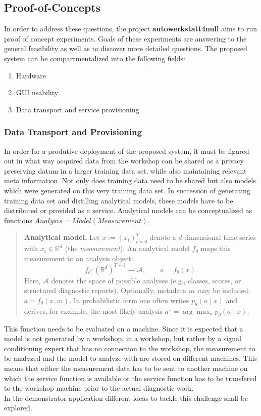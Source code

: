 \subsection{Proof-of-Concepts}
In order to address these questions, the project \textbf{autowerkstatt4null} aims to run proof of concept experiments.
Goals of these experiments are answering to the general feasibility as well as to discover more detailed questions.
The proposed system can be compartmentalized into the following fields:
\begin{enumerate}
  \item Hardware
  \item GUI usability
  \item Data transport and service provisioning 
\end{enumerate}

\subsubsection{Data Transport and Provisioning}
In order for a produtive deployment of the proposed system, it must be figured out in what way acquired data from the workshop can be shared as a privacy preserving datum in a larger training data set, while also maintaining relevant meta information.
Not only does training data need to be shared but also models which were generated on this very training data set.
In succession of generating training data set and distilling analytical models, these models have to be distributed or provided as a service.
Analytical models can be conceptualized as functions $Analysis = Model(Measurement)$.
\begin{quote}
\textbf{Analytical model.}  
Let $x := (x_t)_{t=0}^{T}$ denote a $d$-dimensional time series with $x_t \in \mathbb{R}^d$ (the \emph{measurement}).  
An analytical model $f_\theta$ maps this measurement to an analysis object:
\[
f_\theta : (\mathbb{R}^d)^{T+1} \to \mathcal{A}, \qquad a = f_\theta(x).
\]
Here, $\mathcal{A}$ denotes the space of possible analyses (e.g., classes, scores, or structured diagnostic reports).  
Optionally, metadata $m$ may be included: $a = f_\theta(x, m)$.  
In probabilistic form one often writes $p_\theta(a \mid x)$ and derives, for example, the most likely analysis 
$a^\star = \arg\max_a p_\theta(a \mid x)$.
\end{quote}
This function needs to be evaluated on a machine.
Since it is expected that a model is not generated by a workshop, in a workshop, but rather by a signal conditioning expert that has no connection to the workshop, the measurement to be analyzed and the model to analyze with are stored on different machines.
This means that either the measurement data has to be sent to another machine on which the service function is available or the service function has to be transfered to the workshop machine prior to the actual diagnostic work. \hfill \\
In the demonstrator application different ideas to tackle this challenge shall be explored. 

